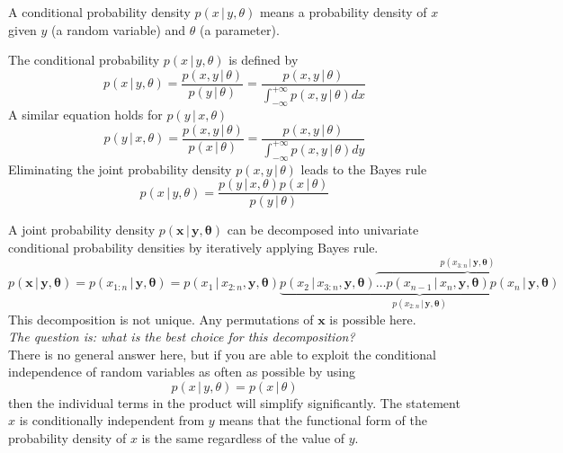 \documentclass{tstextbook}
\begin{document}
A conditional probability density $p(x\,\vert\, y,\theta)$ means a probability density of $x$ given $y$ (a random variable) and $\theta$ (a parameter).

\begin{definition}
  \label{th:conditionalprobabilitydensity}
  The conditional probability $p(x\,\vert\, y,\theta)$ is defined by
  \begin{equation}
    p(x\,\vert\, y,\theta)=\frac{p(x, y\,\vert\, \theta)}{p(y\,\vert\, \theta)}=\frac{p(x, y\,\vert\, \theta)}{\int_{-\infty}^{+\infty}p(x,y\,\vert\, \theta)dx}
  \end{equation}
  A similar equation holds for $p(y\,\vert\, x,\theta)$
  \begin{equation}
    p(y\,\vert\, x,\theta)=\frac{p(x, y\,\vert\, \theta)}{p(x\,\vert\, \theta)}=\frac{p(x, y\,\vert\, \theta)}{\int_{-\infty}^{+\infty}p(x,y\,\vert\, \theta)dy}
  \end{equation}
  Eliminating the joint probability density $p(x, y\,\vert\, \theta)$ leads to the Bayes rule
  \begin{equation}
    p(x\,\vert\, y,\theta)=\frac{p(y\,\vert\, x,\theta)p(x\,\vert\, \theta)}{p(y\,\vert\, \theta)}
  \end{equation} 
\end{definition}

A joint probability density $p(\mathbf{x}\,\vert\, \mathbf{y},\boldsymbol{\theta})$ can be decomposed into univariate conditional probability densities by iteratively applying Bayes rule.
  \begin{equation}
    p(\mathbf{x}\,\vert\, \mathbf{y},\boldsymbol{\theta})=p(x_{1:n}\,\vert\, \mathbf{y},\boldsymbol{\theta})=p(x_1\,\vert\, x_{2:n},\mathbf{y},\boldsymbol{\theta})
\underbrace{p(x_{2}\,\vert\, x_{3:n},\mathbf{y},\boldsymbol{\theta})\overbrace{\ldots p(x_{n-1}\,\vert\, x_n,\mathbf{y},\boldsymbol{\theta})
p(x_{n}\,\vert\, \mathbf{y},\boldsymbol{\theta})}^{p(x_{3:n}\,\vert\, \mathbf{y},\boldsymbol{\theta})}
}_{p(x_{2:n}\,\vert\, \mathbf{y},\boldsymbol{\theta})}
  \end{equation}
This decomposition is not unique. Any permutations of $\mathbf{x}$ is possible here.\\

\textit{The question is: what is the best choice for this decomposition?}\\

There is no general answer here, but if you are able to exploit the conditional independence of random variables as often as possible by using
  \begin{equation}
    p(x\,\vert\, y,\theta)=p(x\,\vert\, \theta)
  \end{equation}
then the individual terms in the product will simplify significantly.
The statement $x$ is conditionally independent from $y$ means that the functional form of the probability density of $x$ is the same regardless of the value of $y$.\\
\end{document}
